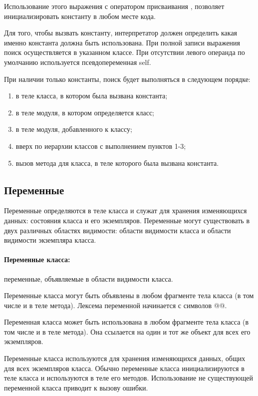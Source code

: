 Использование этого выражения с оператором присваивания \mono{=}, позволяет инициализировать константу в любом месте кода.

Для того, чтобы вызвать константу, интерпретатор должен определить какая именно константа должна быть использована. При полной записи выражения поиск осуществляется в указанном классе. При отсутствии левого операнда по умолчанию используется псевдопеременная self.

При наличии только константы, поиск будет выполняться в следующем порядке:
\begin{enumerate}
  \item в теле класса, в котором была вызвана константа;
  \item в теле модуля, в котором определяется класс;
  \item в теле модуля, добавленного к классу;
  \item вверх по иерархии классов с выполнением пунктов 1-3;
  \item вызов метода  для класса, в теле которого была вызвана константа.
\end{enumerate}

\subsection{Переменные} 

Переменные определяются в теле класса и служат для хранения изменяющихся данных: состояния класса и его экземпляров. Переменные могут существовать в двух различных областях видимости: области видимости класса и области видимости экземпляра класса.

\paragraph*{Переменные класса:} переменные, объявляемые в области видимости класса.

Переменные класса могут быть объявлены в любом фрагменте тела класса (в том числе и в теле метода). Лексема переменной начинается с символов @@. 

Переменная класса может быть использована в любом фрагменте тела класса (в том числе и в теле метода). Она ссылается на один и тот же объект для всех его экземпляров.

Переменные класса используются для хранения изменяющихся данных, общих для всех экземпляров класса. Обычно переменные класса инициализируются в теле класса и используются в теле его методов. Использование не существующей переменной класса приводит к вызову ошибки.


